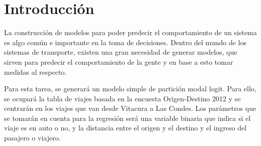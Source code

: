 \section{Introducción}

La construcción de modelos para poder predecir el comportamiento de un sistema es algo común e importante en la toma de decisiones. Dentro del mundo de los sistemas de transporte, existen una gran necesidad de generar modelos, que sirven para predecir el comportamiento de la gente y en base a esto tomar medidas al respecto. 

Para esta tarea, se generará un modelo simple de partición modal logit. Para ello, se ocupará la tabla de viajes basada en la encuesta Origen-Destino 2012 y se centrarán en los viajes que van desde Vitacura a Las Condes. Los parámetros que se tomarán en cuenta para la regresión será una variable binaria que indica si el viaje es en auto o no, y la distancia entre el origen y el destino y el ingreso del pasajero o viajero.